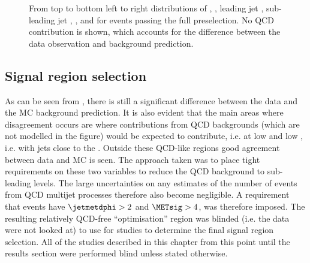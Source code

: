 \begin{figure}
  \caption{From top to bottom left to right distributions of \detajj, \Mjj, leading jet \pt, sub-leading jet \pt, \METnoMU, \METsig and \jetmetdphi for events passing the full preselection. No \ac{QCD} contribution is shown, which accounts for the difference between the data observation and background prediction.}
  \label{fig:parkedpostpresel}
\end{figure}




\subsection{Signal region selection}
\label{sec:parkedsigsel}
As can be seen from , there is still a significant difference between the data and the \ac{MC} background prediction. It is also evident that the main areas where disagreement occurs are where contributions from \ac{QCD} backgrounds (which are not modelled in the figure) would be expected to contribute, i.e. at low \METsig and low \jetmetdphi, i.e. with jets close to the \METnoMU. Outside these \ac{QCD}-like regions good agreement between data and \ac{MC} is seen. The approach taken was to place tight requirements on these two variables to reduce the \ac{QCD} background to sub-leading levels. The large uncertainties on any estimates of the number of events from \ac{QCD} multijet processes therefore also become negligible. A requirement that events have $\jetmetdphi>2$ and $\METsig>4$, was therefore imposed. The resulting relatively \ac{QCD}-free ``optimisation'' region was blinded (i.e. the data were not looked at) to use for studies to determine the final signal region selection. All of the studies described in this chapter from this point until the results section were performed blind unless stated otherwise.

